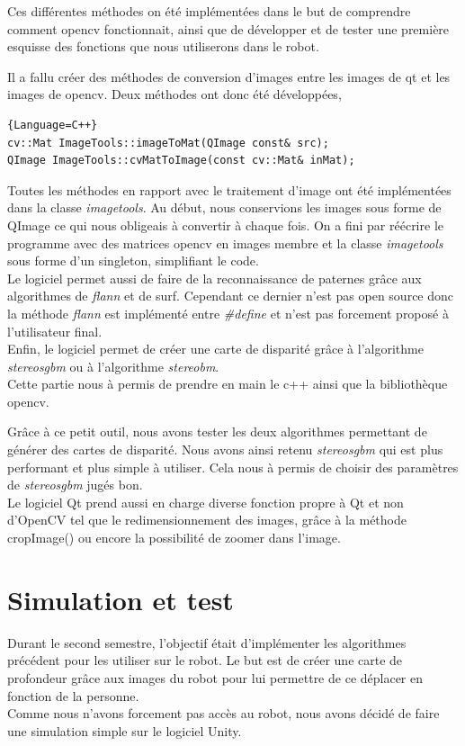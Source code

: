\documentclass[12pt,a4paper]{report}
\begin{document}
Ces différentes méthodes on été implémentées dans le but de comprendre comment opencv fonctionnait, ainsi que de développer et de tester une première esquisse des fonctions que nous utiliserons dans le robot.

Il a fallu créer des méthodes de conversion d'images entre les images de qt et les images de opencv. Deux méthodes ont donc été développées,

\begin{lstlisting}{Language=C++}
cv::Mat ImageTools::imageToMat(QImage const& src);
QImage ImageTools::cvMatToImage(const cv::Mat& inMat);
\end{lstlisting}

Toutes les méthodes en rapport avec le traitement d'image ont été implémentées dans la classe \textit{imagetools}. Au début, nous conservions les images sous forme de QImage ce qui nous obligeais à convertir à chaque fois. On a fini par réécrire le programme avec des matrices opencv en images membre et la classe \textit{imagetools} sous forme d'un singleton, simplifiant le code.\\
Le logiciel permet aussi de faire de la reconnaissance de paternes grâce aux algorithmes de \textit{flann} et de surf. Cependant ce dernier n'est pas open source donc la méthode \textit{flann} est implémenté entre \textit{\#define} et n'est pas forcement proposé à l'utilisateur final.\\
Enfin, le logiciel permet de créer une carte de disparité grâce à l'algorithme \textit{stereosgbm} ou à l'algorithme \textit{stereobm}.\\

Cette partie nous à permis de prendre en main le c++ ainsi que la bibliothèque opencv. 

Grâce à ce petit outil, nous avons tester les deux algorithmes permettant de générer des cartes de disparité. Nous avons ainsi retenu \textit{stereosgbm} qui est plus performant et plus simple à utiliser. Cela nous à permis de choisir des paramètres de \textit{stereosgbm} jugés bon.\\

Le logiciel Qt prend aussi en charge diverse fonction propre à Qt et non d'OpenCV tel que le redimensionnement des images, grâce à la méthode cropImage() ou encore la possibilité de zoomer dans l'image.
\section{Simulation et test}
Durant le second semestre, l'objectif était d'implémenter les algorithmes précédent pour les utiliser sur le robot. Le but est de créer une carte de profondeur grâce aux images du robot pour lui permettre de ce déplacer en fonction de la personne.\\
Comme nous n'avons forcement pas accès au robot, nous avons décidé de faire une simulation simple sur le logiciel Unity.\\
\end{document}
